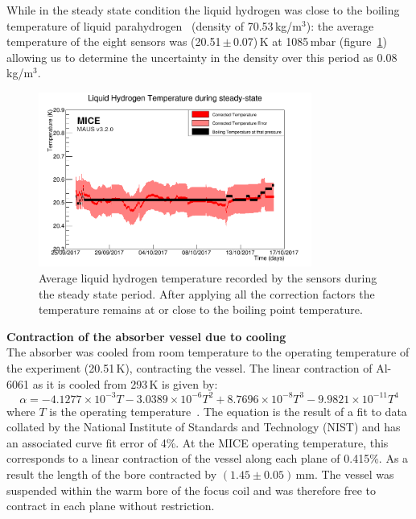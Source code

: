 While in the steady state condition the liquid hydrogen was close to the
boiling temperature of liquid parahydrogen~\cite{NOTE524} (density of 70.53\,kg/m$^{3}$):
the average temperature of the eight sensors was (20.51\,$\mathrm{\pm}$\,0.07)\,K at 1085\,mbar
(figure~\ref{Fig:TempCalibrated}) allowing us to determine the
uncertainty in the density over this period as 0.08\,kg/m$^{3}$. \\
\begin{figure}
  \begin{center}
    \includegraphics[width=0.80\textwidth]{SteadyState60mK_logo.png}
  \end{center}
  \caption{
    Average liquid hydrogen temperature recorded by the sensors during the
    steady state period.
    After applying all the correction factors the temperature remains
    at or close to the boiling point temperature.
  }
  \label{Fig:TempCalibrated}
\end{figure}

\newpage

\noindent\textbf{Contraction of the absorber vessel due to cooling} \\
\noindent
The absorber was cooled from room temperature to the operating
temperature of the experiment (20.51\,K), contracting the vessel.
The linear contraction of Al-6061 as it is cooled from 293\,K is given
by: 
\begin{equation}
  \alpha =-4.1277\times {10}^{-3}T-3.0389\times {10}^{-6}T^2+8.7696\times {10}^{-8}T^3-9.9821\times {10}^{-11}T^4
\end{equation}
where $T$ is the operating temperature~\cite{Hardin}.
The equation is the result of a fit to data collated by the National
Institute of Standards and Technology (NIST) and has an associated
curve fit error of 4\%. 
At the MICE operating temperature, this corresponds to a linear
contraction of the vessel along each plane of 0.415\%.
As a result the length of the bore contracted by
$(1.45 \pm 0.05)$\,mm.
The vessel was suspended within the warm bore of the focus coil and
was therefore free to contract in each plane without restriction.  \\

